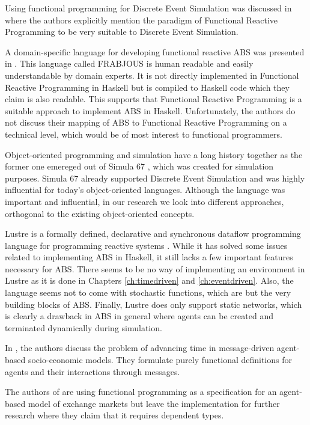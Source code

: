 Using functional programming for Discrete Event Simulation was discussed in \cite{jankovic_functional_2007} where the authors explicitly mention the paradigm of Functional Reactive Programming to be very suitable to Discrete Event Simulation.

A domain-specific language for developing functional reactive ABS was presented in \cite{schneider_towards_2012,vendrov_frabjous_2014}. This language called FRABJOUS is human readable and easily understandable by domain experts. It is not directly implemented in Functional Reactive Programming in Haskell but is compiled to Haskell code which they claim is also readable. This supports that Functional Reactive Programming is a suitable approach to implement ABS in Haskell. Unfortunately, the authors do not discuss their mapping of ABS to Functional Reactive Programming on a technical level, which would be of most interest to functional programmers.

Object-oriented programming and simulation have a long history together as the former one emereged out of Simula 67 \cite{dahl_birth_2002}, which was created for simulation purposes. Simula 67 already supported Discrete Event Simulation and was highly influential for today's object-oriented languages. Although the language was important and influential, in our research we look into different approaches, orthogonal to the existing object-oriented concepts.

Lustre is a formally defined, declarative and synchronous dataflow programming language for programming reactive systems \cite{halbwachs_synchronous_1991}. While it has solved some issues related to implementing ABS in Haskell, it still lacks a few important features necessary for ABS. There seems to be no way of implementing an environment in Lustre as it is done in Chapters \ref{ch:timedriven} and \ref{ch:eventdriven}. Also, the language seems not to come with stochastic functions, which are but the very building blocks of ABS. Finally, Lustre does only support static networks, which is clearly a drawback in ABS in general where agents can be created and terminated dynamically during simulation.

In \cite{botta_time_2010}, the authors discuss the problem of advancing time in message-driven agent-based socio-economic models. They formulate purely functional definitions for agents and their interactions through messages.

The authors of \cite{botta_functional_2011} are using functional programming as a specification for an agent-based model of exchange markets but leave the implementation for further research where they claim that it requires dependent types. %

